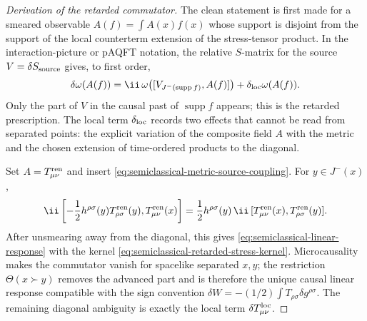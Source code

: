 \begin{proof}[Derivation of the retarded commutator]
The clean statement is first made for a smeared observable
\(A(f)=\int A(x)f(x)\) whose support is disjoint from the support of the
local counterterm extension of the stress-tensor product.  In the
interaction-picture or pAQFT notation, the relative \(S\)-matrix for the
source \(V=\delta S_{\rm source}\) gives, to first order,
\[
  \delta\omega(A(f))
  =
  \ii\,\omega\!\left([V_{J^-(\operatorname{supp}f)},A(f)]\right)
  +
  \delta_{\rm loc}\omega(A(f)).
\]
Only the part of \(V\) in the causal past of \(\operatorname{supp}f\)
appears; this is the retarded prescription.  The local term
\(\delta_{\rm loc}\) records two effects that cannot be read from separated
points: the explicit variation of the composite field \(A\) with the metric
and the chosen extension of time-ordered products to the diagonal.

Set \(A=T_{\mu\nu}^{\rm ren}\) and insert
\eqref{eq:semiclassical-metric-source-coupling}.  For \(y\in J^-(x)\),
\[
  \ii\left[
    -\frac12 h^{\rho\sigma}(y)T_{\rho\sigma}^{\rm ren}(y),
    T_{\mu\nu}^{\rm ren}(x)
  \right]
  =
  \frac12 h^{\rho\sigma}(y)\,
  \ii\,[T_{\mu\nu}^{\rm ren}(x),T_{\rho\sigma}^{\rm ren}(y)] .
\]
After unsmearing away from the diagonal, this gives
\eqref{eq:semiclassical-linear-response} with the kernel
\eqref{eq:semiclassical-retarded-stress-kernel}.  Microcausality makes the
commutator vanish for spacelike separated \(x,y\); the restriction
\(\Theta(x\succ y)\) removes the advanced part and is therefore the unique
causal linear response compatible with the sign convention
\(\delta W=-(1/2)\int T_{\rho\sigma}\delta g^{\rho\sigma}\).  The remaining
diagonal ambiguity is exactly the local term
\(\delta T_{\mu\nu}^{\rm loc}\).
\end{proof}

